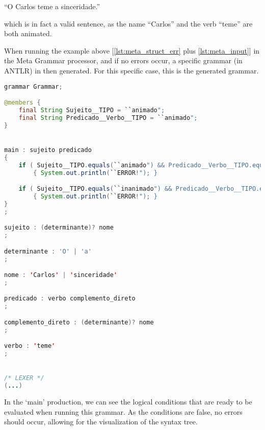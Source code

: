 ``O Carlos teme a sinceridade.''

\noindent which is in fact a valid sentence, as the name ``Carlos'' and the verb ``teme'' are both animated.

When running the example above [\ref{lst:meta_struct_err} plus \ref{lst:meta_input}] in the Meta Grammar processor, and if no errors occur, a specific grammar (in ANTLR) 
in then generated. For this specific case, this is the generated grammar.

\begin{center}
\begin{minipage}{15cm}
\begin{lstlisting}[language=java, basicstyle=\tiny, label={lst:case_study_sentence}, caption=Example of a specific generated grammar.]
grammar Grammar;

@members {
    final String Sujeito__TIPO = ``animado";
    final String Predicado__Verbo__TIPO = ``animado";
}


main : sujeito predicado
{
    if ( Sujeito__TIPO.equals(``animado") && Predicado__Verbo__TIPO.equals(``inanimado") ) 
        { System.out.println(``ERROR!"); }

    if ( Sujeito__TIPO.equals(``inanimado") && Predicado__Verbo__TIPO.equals(``animado") ) 
        { System.out.println(``ERROR!"); }
}
;

sujeito : (determinante)? nome 
;

determinante : 'O' | 'a'
;

nome : 'Carlos' | 'sinceridade'
;

predicado : verbo complemento_direto 
;

complemento_direto : (determinante)? nome 
;

verbo : 'teme'
;


/* LEXER */
(...)
\end{lstlisting}
\end{minipage}
\end{center}

In the ‘main’ production, we can see the logical conditions that are ready to be evaluated when running this grammar. As the conditions are false, no errors should occur,
allowing for the visualization of the syntax tree.


